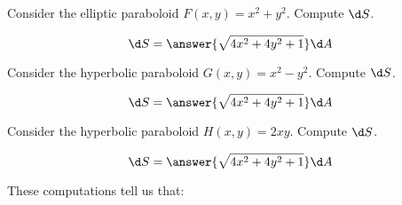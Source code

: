 \documentclass{ximera}
\author{}
\begin{document}
\begin{exercise}
  Consider the elliptic paraboloid $F(x,y) = x^2 + y^2$. Compute $\d
  S$.
  \begin{prompt}
    \[
    \d S = \answer{\sqrt{4x^2 + 4y^2 + 1}} \d A
    \]
  \end{prompt}
  \begin{exercise}
  Consider the hyperbolic paraboloid $G(x,y) = x^2 - y^2$. Compute $\d
  S$.
  \begin{prompt}
    \[
    \d S = \answer{\sqrt{4x^2 + 4y^2 + 1}} \d A
    \]
  \end{prompt}
  \begin{exercise}
  Consider the hyperbolic paraboloid $H(x,y) = 2xy$. Compute $\d
  S$.
  \begin{prompt}
    \[
    \d S = \answer{\sqrt{4x^2 + 4y^2 + 1}} \d A
    \]
  \end{prompt}
  \begin{exercise}
    These computations tell us that:
    \begin{multipleChoice}


    \end{multipleChoice}
  \end{exercise}
  \end{exercise}
  \end{exercise}
\end{exercise}
\end{document}
